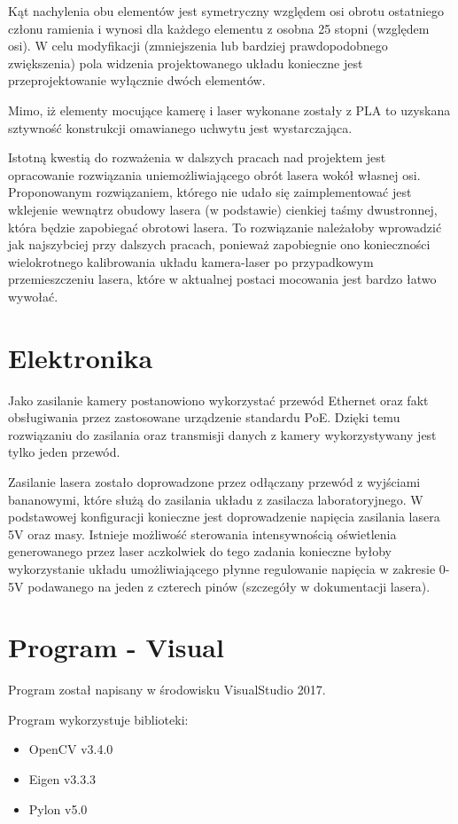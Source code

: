 \documentclass[conference]{IEEEtran}
\begin{document}
Kąt nachylenia obu elementów jest symetryczny względem osi obrotu ostatniego członu ramienia i wynosi dla każdego elementu z osobna 25 stopni (względem osi). W celu modyfikacji (zmniejszenia lub bardziej prawdopodobnego zwiększenia) pola widzenia projektowanego układu konieczne jest przeprojektowanie wyłącznie dwóch elementów.

Mimo, iż elementy mocujące kamerę i laser wykonane zostały z PLA to uzyskana sztywność konstrukcji omawianego uchwytu jest wystarczająca.

Istotną kwestią do rozważenia w dalszych pracach nad projektem jest opracowanie rozwiązania uniemożliwiającego obrót lasera wokół własnej osi. Proponowanym rozwiązaniem, którego nie udało się zaimplementować jest wklejenie wewnątrz obudowy lasera (w podstawie) cienkiej taśmy dwustronnej, która będzie zapobiegać obrotowi lasera. To rozwiązanie należałoby wprowadzić jak najszybciej przy dalszych pracach, ponieważ zapobiegnie ono konieczności wielokrotnego kalibrowania układu kamera-laser po przypadkowym przemieszczeniu lasera, które w aktualnej postaci mocowania jest bardzo łatwo wywołać.

\section{Elektronika}

Jako zasilanie kamery postanowiono wykorzystać przewód Ethernet oraz fakt obsługiwania przez zastosowane urządzenie standardu PoE. Dzięki temu rozwiązaniu do zasilania oraz transmisji danych z kamery wykorzystywany jest tylko jeden przewód.

Zasilanie lasera zostało doprowadzone przez odłączany przewód z wyjściami bananowymi, które służą do zasilania układu z zasilacza laboratoryjnego. W podstawowej konfiguracji konieczne jest doprowadzenie napięcia zasilania lasera 5V oraz masy. Istnieje możliwość sterowania intensywnością oświetlenia generowanego przez laser aczkolwiek do tego zadania konieczne byłoby wykorzystanie układu umożliwiającego płynne regulowanie napięcia w zakresie 0-5V podawanego na jeden z czterech pinów (szczegóły w dokumentacji lasera).

\section{Program - Visual}

Program został napisany w środowisku VisualStudio 2017.

Program wykorzystuje biblioteki:
\begin{itemize}
\item OpenCV v3.4.0
\item Eigen v3.3.3
\item Pylon v5.0
\end{itemize}
\end{document}
